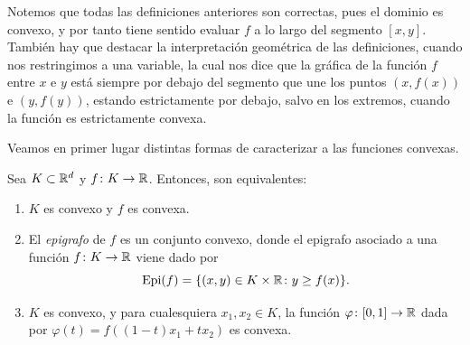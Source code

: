 \documentclass{book}
\begin{document}
Notemos que todas las definiciones anteriores son correctas, pues el dominio es convexo, y por tanto tiene sentido evaluar $f$ a lo largo del segmento $[x,y]$. También hay que destacar la interpretación geométrica de las definiciones, cuando nos restringimos a una variable, la cual nos dice que la gráfica de la función $f$ entre $x$ e $y$ está siempre por debajo del segmento que une los puntos $(x,f(x))$ e $(y,f(y))$, estando estrictamente por debajo, salvo en los extremos, cuando la función es estrictamente convexa.

Veamos en primer lugar distintas formas de caracterizar a las funciones convexas.

\begin{prop}
	Sea $K \subset \mathbb{R}^d$ y $f\colon K \to \mathbb{R}$. Entonces, son equivalentes:
	\begin{enumerate}
		\item $K$ es convexo y $f$ es convexa. \label{item:prop_convex:1}
		\item El \emph{epigrafo} de $f$ es un conjunto convexo, donde el epigrafo asociado a una función $f \colon K \to \mathbb{R}$ viene dado por
		\[ \operatorname{Epi}(f) = \{(x,y) \in K \times \mathbb{R} \colon y \ge f(x) \}. \] \label{item:prop_convex:2}
		\item $K$ es convexo, y para cualesquiera $x_1,x_2 \in K$, la función $\varphi\colon [0,1] \to \mathbb{R}$ dada por $\varphi(t) = f((1-t)x_1 + tx_2)$ es convexa. \label{item:prop_convex:3}
	\end{enumerate}
\end{prop}
\end{document}

